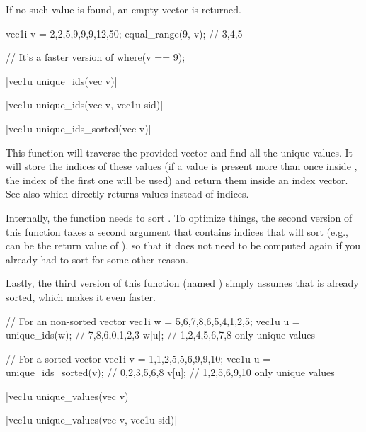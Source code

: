 If no such value is found, an empty vector is returned.

\begin{example}
\begin{cppcode}
vec1i v = {2,2,5,9,9,9,12,50};
equal_range(9, v); // {3,4,5}

// It's a faster version of
where(v == 9);
\end{cppcode}
\end{example}

\funcitem \cppinline|vec1u unique_ids(vec v)| 

\cppinline|vec1u unique_ids(vec v, vec1u sid)|

\cppinline|vec1u unique_ids_sorted(vec v)| 

This function will traverse the provided vector  and find all the unique values. It will store the indices of these values (if a value is present more than once inside , the index of the first one will be used) and return them inside an index vector. See also  which directly returns values instead of indices.

Internally, the function needs to sort . To optimize things, the second version of this function takes a second argument  that contains indices that will sort  (e.g.,  can be the return value of ), so that it does not need to be computed again if you already had to sort  for some other reason.

Lastly, the third version of this function (named ) simply assumes that  is already sorted, which makes it even faster.

\begin{example}
\begin{cppcode}
// For an non-sorted vector
vec1i w = {5,6,7,8,6,5,4,1,2,5};
vec1u u = unique_ids(w); // {7,8,6,0,1,2,3}
w[u]; // {1,2,4,5,6,7,8} only unique values

// For a sorted vector
vec1i v = {1,1,2,5,5,6,9,9,10};
vec1u u = unique_ids_sorted(v); // {0,2,3,5,6,8}
v[u]; // {1,2,5,6,9,10} only unique values
\end{cppcode}
\end{example}

\funcitem \cppinline|vec1u unique_values(vec v)| 

\cppinline|vec1u unique_values(vec v, vec1u sid)|

